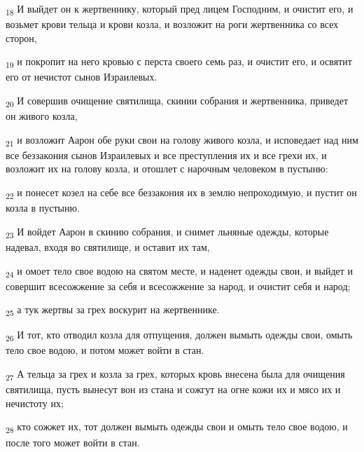 \begin{tcolorbox}
\textsubscript{18} И выйдет он к жертвеннику, который пред лицем Господним, и очистит его, и возьмет крови тельца и крови козла, и возложит на роги жертвенника со всех сторон,
\end{tcolorbox}
\begin{tcolorbox}
\textsubscript{19} и покропит на него кровью с перста своего семь раз, и очистит его, и освятит его от нечистот сынов Израилевых.
\end{tcolorbox}
\begin{tcolorbox}
\textsubscript{20} И совершив очищение святилища, скинии собрания и жертвенника, приведет он живого козла,
\end{tcolorbox}
\begin{tcolorbox}
\textsubscript{21} и возложит Аарон обе руки свои на голову живого козла, и исповедает над ним все беззакония сынов Израилевых и все преступления их и все грехи их, и возложит их на голову козла, и отошлет с нарочным человеком в пустыню:
\end{tcolorbox}
\begin{tcolorbox}
\textsubscript{22} и понесет козел на себе все беззакония их в землю непроходимую, и пустит он козла в пустыню.
\end{tcolorbox}
\begin{tcolorbox}
\textsubscript{23} И войдет Аарон в скинию собрания, и снимет льняные одежды, которые надевал, входя во святилище, и оставит их там,
\end{tcolorbox}
\begin{tcolorbox}
\textsubscript{24} и омоет тело свое водою на святом месте, и наденет одежды свои, и выйдет и совершит всесожжение за себя и всесожжение за народ, и очистит себя и народ;
\end{tcolorbox}
\begin{tcolorbox}
\textsubscript{25} а тук жертвы за грех воскурит на жертвеннике.
\end{tcolorbox}
\begin{tcolorbox}
\textsubscript{26} И тот, кто отводил козла для отпущения, должен вымыть одежды свои, омыть тело свое водою, и потом может войти в стан.
\end{tcolorbox}
\begin{tcolorbox}
\textsubscript{27} А тельца за грех и козла за грех, которых кровь внесена была для очищения святилища, пусть вынесут вон из стана и сожгут на огне кожи их и мясо их и нечистоту их;
\end{tcolorbox}
\begin{tcolorbox}
\textsubscript{28} кто сожжет их, тот должен вымыть одежды свои и омыть тело свое водою, и после того может войти в стан.
\end{tcolorbox}
